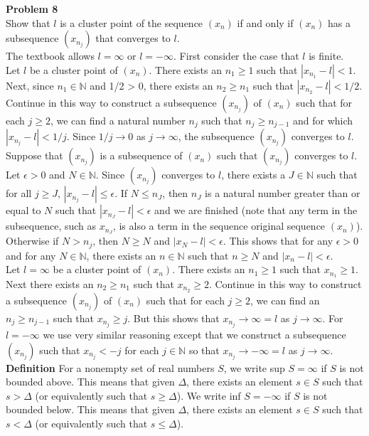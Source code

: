 \documentclass[a4paper]{article}
\begin{document}
{\bf Problem 8}\\
Show that $l$ is a cluster point of the sequence $(x_n)$ if and only if $(x_n)$ has a subsequence $(x_{n_j})$ that converges to $l$.\\

The textbook allows $l = \infty$ or $l = -\infty$. First consider the case that $l$ is finite. \\

Let $l$ be a cluster point of $(x_n)$. There exists an $n_1 \geq 1$ such that $|x_{n_1} - l| < 1$. Next, since $n_1 \in \mathbb{N}$ and 1/2 > 0, there exists an $n_2 \geq n_1$ such that $|x_{n_2} - l| < 1/2$. Continue in this way to construct a subsequence $(x_{n_j})$ of $(x_n)$ such that for each $j \geq 2$, we can find a natural number $n_j$ such that $n_j \geq n_{j-1}$ and for which $|x_{n_j} - l| < 1/j$. Since $1/j \rightarrow 0$ as $j \rightarrow \infty$, the subsequence $(x_{n_j})$ converges to $l$. \\

Suppose that $(x_{n_j})$ is a subsequence of $(x_n)$ such that $(x_{n_j})$ converges to $l$. Let $\epsilon >0$ and $N \in \mathbb{N}$. Since $(x_{n_j})$ converges to $l$, there exists a $J \in \mathbb{N}$ such that for all $j \geq J$, $|x_{n_j} -l| \leq \epsilon$. If $N \leq n_J$, then $n_J$ is a natural number greater than or equal to $N$ such that $|x_{n_J} - l| < \epsilon$ and we are finished (note that any term in the subsequence, such as $x_{n_J}$, is also a term in the sequence original sequence $(x_n)$). Otherwise if $N > n_j$, then $N \geq N$ and $|x_{N} - l|< \epsilon$. This shows that for any $\epsilon > 0 $ and for any $N \in \mathbb{N}$, there exists an $n\in \mathbb{N}$ such that $n \geq N$ and $|x_n - l| < \epsilon$. \\

Let $l = \infty$ be a cluster point of $(x_n)$. There exists an $n_1 \geq 1$ such that $x_{n_1} \geq 1$. Next there exists an $n_2 \geq n_1$ such that $x_{n_2} \geq 2$. Continue in this way to construct a subsequence $(x_{n_j})$ of $(x_n)$ such that for each $j \geq 2$, we can find an $n_j \geq n_{j-1}$ such that $x_{n_j} \geq j$. But this shows that $x_{n_j} \rightarrow \infty = l$ as $j \rightarrow \infty$. For $l = -\infty$ we use very similar reasoning except that we construct a subsequence $(x_{n_j})$ such that $x_{n_j} < -j$ for each $j \in \mathbb{N}$ so that $x_{n_j} \rightarrow -\infty = l$ as $j \rightarrow \infty$. \\

{\bf Definition} For a nonempty set of real numbers $S$, we write sup $S = \infty$ if $S$ is not bounded above. This means that given $\Delta$, there exists an element $s \in S$ such that $s > \Delta$ (or equivalently such that $s \geq \Delta$). We write inf $S = -\infty$ if $S$ is not bounded below. This means that given $\Delta$, there exists an element $s \in S$ such that $s < \Delta$ (or equivalently such that $s \leq \Delta$).\\
\end{document}

